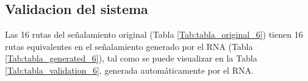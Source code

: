 \subsection{Validacion del sistema}

    Las 16 rutas del señalamiento original (Tabla \ref{Tab:tabla_original_6}) tienen 16 rutas equivalentes en el señalamiento generado por el RNA (Tabla \ref{Tab:tabla_generated_6}), tal como se puede visualizar en la Tabla \ref{Tab:tabla_validation_6}, generada automáticamente por el RNA.

    \begin{table}[H]
        {
        \caption{Equivalencias entre las rutas originales y las generadas por el RNA.}
        \label{Tab:tabla_validation_6}
        \centering
            \begin{center}
\end{center}}
\end{table}
